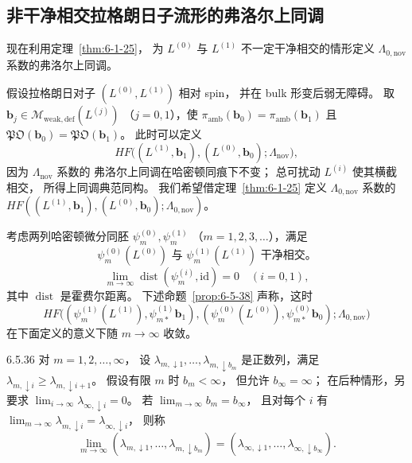 
\subsection{非干净相交拉格朗日子流形的弗洛尔上同调}
\label{subsec:6-5-4}

现在利用定理~\ref{thm:6-1-25}，
为 $L^{(0)}$ 与 $L^{(1)}$
不一定干净相交的情形定义
$\Lambda_{0,\mathrm{nov}}$ 系数的弗洛尔上同调。

假设拉格朗日对子
$(L^{(0)},L^{(1)})$ 相对 spin，
并在 bulk 形变后弱无障碍。
取
$\mathbf b_j\in
\mathcal M_{\mathrm{weak,def}}(L^{(j)})$
（$j=0,1$），使
$\pi_{\mathrm{amb}}(\mathbf b_0)
=\pi_{\mathrm{amb}}(\mathbf b_1)$ 且
$\mathfrak{PO}(\mathbf b_0)
=\mathfrak{PO}(\mathbf b_1)$。
此时可以定义
\[
HF\bigl((L^{(1)},\mathbf b_1),
(L^{(0)},\mathbf b_0);
\Lambda_{\mathrm{nov}}\bigr),
\]
因为 $\Lambda_{\mathrm{nov}}$ 系数的
弗洛尔上同调在哈密顿同痕下不变；
总可扰动 $L^{(i)}$ 使其横截相交，
所得上同调典范同构。
我们希望借定理~\ref{thm:6-1-25}
定义 $\Lambda_{0,\mathrm{nov}}$ 系数的
$HF((L^{(1)},\mathbf b_1),
(L^{(0)},\mathbf b_0);
\Lambda_{0,\mathrm{nov}})$。

考虑两列哈密顿微分同胚
$\psi_m^{(0)},\psi_m^{(1)}$
（$m=1,2,3,\ldots$），满足
\begin{equation}
\psi_m^{(0)}(L^{(0)})
\text{ 与 }\psi_m^{(1)}(L^{(1)})
\text{ 干净相交。}
\tag{6.5.35.1}\label{eq:6-5-35-1}
\end{equation}
\begin{equation}
\lim_{m\to\infty}
\operatorname{dist}(\psi_m^{(i)},\mathrm{id})=0
\quad(i=0,1),
\tag{6.5.35.2}\label{eq:6-5-35-2}
\end{equation}
其中 $\operatorname{dist}$ 是霍费尔距离。
下述命题~\ref{prop:6-5-38}
声称，这时
\[
HF\bigl(
(\psi_m^{(1)}(L^{(1)}),
\psi_{m*}^{(1)}\mathbf b_1),
(\psi_m^{(0)}(L^{(0)}),
\psi_{m*}^{(0)}\mathbf b_0);
\Lambda_{0,\mathrm{nov}}\bigr)
\]
在下面定义的意义下随 $m\to\infty$ 收敛。

\begin{definition}{6.5.36}\label{def:6-5-36}
对 $m=1,2,\ldots,\infty$，
设 $\lambda_{m,\downarrow1},\ldots,
\lambda_{m,\downarrow b_m}$
是正数列，满足
$\lambda_{m,\downarrow i}
\ge\lambda_{m,\downarrow i+1}$。
假设有限 $m$ 时 $b_m<\infty$，
但允许 $b_\infty=\infty$；
在后种情形，另要求
$\lim_{i\to\infty}
\lambda_{\infty,\downarrow i}=0$。
若 $\lim_{m\to\infty}b_m=b_\infty$，
且对每个 $i$ 有
$\lim_{m\to\infty}
\lambda_{m,\downarrow i}
=\lambda_{\infty,\downarrow i}$，
则称
\[
\lim_{m\to\infty}
(\lambda_{m,\downarrow1},\ldots,
\lambda_{m,\downarrow b_m})
=
(\lambda_{\infty,\downarrow1},\ldots,
\lambda_{\infty,\downarrow b_\infty}).
\]
\end{definition}

